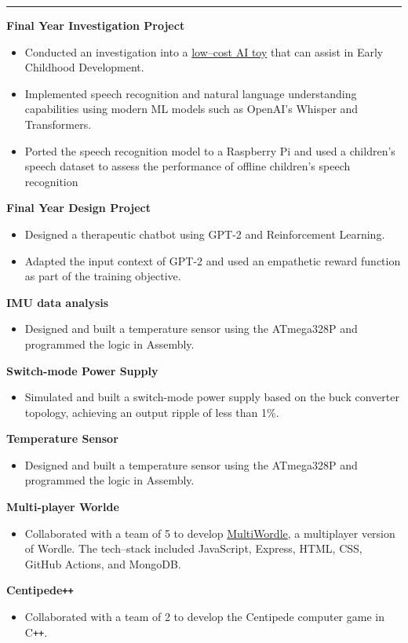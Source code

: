 \documentclass[10pt, a4paper]{article}
\newcommand{\heading}[1]{
\makebox[0pt][l]{\Large \sc \hspace{2pt}#1}
\rule[-0.7ex]{\columnwidth}{0.5pt}\vspace{1.0ex}
}
\newcommand{\subheading}[1]{{\bfseries #1}}
\newcommand{\subheadSkip}{\vspace{0.7ex}}
\newenvironment{mysection}[1]
{\vspace{2.5ex}
\heading{#1}
\begin{adjustwidth}{0.3cm}{0cm}}
{\end{adjustwidth} }
\begin{document}
\begin{mysection}{Projects}
    
 \subheading{Final Year Investigation Project}
         
     \begin{itemize}
     \item       Conducted an investigation into a \href{https://github.com/RyanSelesnik/AI-Toy}{low--cost AI toy} that can assist in Early Childhood Development. 

         \item Implemented speech recognition and natural language understanding capabilities using modern ML models such as OpenAI's Whisper and Transformers.
            \item Ported the speech recognition model to a Raspberry Pi and used a children's speech dataset to assess the performance of offline children's speech recognition
     \end{itemize} 
\subheadSkip   
 \subheading{Final Year Design Project} 
 \begin{itemize}
     \item Designed a therapeutic chatbot using GPT-2 and Reinforcement Learning.
     \item Adapted the input context of GPT-2 and used an empathetic reward function as part of the training objective.
 \end{itemize} 
 \subheadSkip
\subheading{IMU data analysis} 
\begin{itemize}
    \item Designed and built a temperature sensor using the ATmega328P and programmed the logic in Assembly.
\end{itemize}
 \subheadSkip
\subheading{Switch-mode Power Supply} 
\begin{itemize}
    \item Simulated and built a switch-mode power supply based on the buck converter topology, achieving an output ripple of less than 1\%.
\end{itemize}
 \subheadSkip
\subheading{Temperature Sensor} 
\begin{itemize}
    \item Designed and built a temperature sensor using the ATmega328P and programmed the logic in Assembly.
\end{itemize}
 \subheadSkip
\subheading{Multi-player Worlde} 
\begin{itemize}
    \item Collaborated with a team of 5 to develop \href{https://github.com/witseie-elen4010/2022-group-lab-001}{MultiWordle}, a multiplayer version of Wordle. The tech--stack included JavaScript, Express, HTML, CSS, GitHub Actions, and MongoDB. 
\end{itemize}
 \subheadSkip

\subheading{Centipede\texttt{++}} 
\begin{itemize}
    \item Collaborated with a team of 2 to develop the Centipede computer game in C\texttt{++}.
\end{itemize}


\end{mysection}
\end{document}
